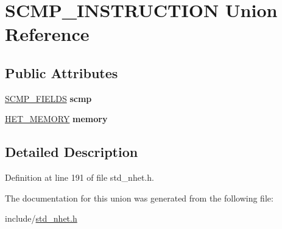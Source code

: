 \hypertarget{unionSCMP__INSTRUCTION}{}\section{S\+C\+M\+P\+\_\+\+I\+N\+S\+T\+R\+U\+C\+T\+I\+ON Union Reference}
\label{unionSCMP__INSTRUCTION}
\subsection*{Public Attributes}
\begin{DoxyCompactItemize}
\item 
\mbox{\label{unionSCMP__INSTRUCTION_ae0bfdf555d0c67ab2c0600dee9d663e0}} 
\mbox{\hyperlink{structscmp__format}{S\+C\+M\+P\+\_\+\+F\+I\+E\+L\+DS}} {\bfseries scmp}
\item 
\mbox{\label{unionSCMP__INSTRUCTION_a4aeb7a8159ab3a364b212a9627fff07b}} 
\mbox{\hyperlink{structmemory__format}{H\+E\+T\+\_\+\+M\+E\+M\+O\+RY}} {\bfseries memory}
\end{DoxyCompactItemize}


\subsection{Detailed Description}


Definition at line 191 of file std\+\_\+nhet.\+h.



The documentation for this union was generated from the following file\+:\begin{DoxyCompactItemize}
\item 
include/\mbox{\hyperlink{std__nhet_8h}{std\+\_\+nhet.\+h}}\end{DoxyCompactItemize}
